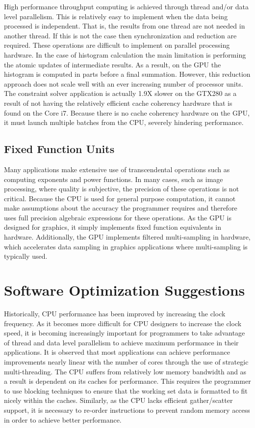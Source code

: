\documentclass[conference]{IEEEtran}
\begin{document}
High performance throughput computing is achieved through thread and/or data level parallelism. This is relatively easy to implement when the data being processed is independent. That is, the results from one thread are not needed in another thread. If this is not the case then synchronization and reduction are required. These operations are difficult to implement on parallel processing hardware. In the case of histogram calculation the main limitation is performing the atomic updates of intermediate results. As a result, on the GPU the histogram is computed in parts before a final summation. However, this reduction approach does not scale well with an ever increasing number of processor units. The constraint solver application is actually 1.9X slower on the GTX280 as a result of not having the relatively efficient cache coherency hardware that is found on the Core i7. Because there is no cache coherency hardware on the GPU, it must launch multiple batches from the CPU, severely hindering performance. 

\subsection{Fixed Function Units}

Many applications make extensive use of transcendental operations such as computing exponents and power functions. In many cases, such as image processing, where quality is subjective, the precision of these operations is not critical. Because the CPU is used for general purpose computation, it cannot make assumptions about the accuracy the programmer requires and therefore uses full precision algebraic expressions for these operations. As the GPU is designed for graphics, it simply implements fixed function equivalents in hardware. Additionally, the GPU implements filtered multi-sampling in hardware, which accelerates data sampling in graphics applications where multi-sampling is typically used.

\section{Software Optimization Suggestions}

Historically, CPU performance has been improved by increasing the clock frequency. As it becomes more difficult for CPU designers to increase the clock speed, it is becoming increasingly important for programmers to take advantage of thread and data level parallelism to achieve maximum performance in their applications. It is observed that most applications can achieve  performance improvements nearly linear with the number of cores through the use of strategic multi-threading. The CPU suffers from relatively low memory bandwidth and as a result is dependent on its caches for performance. This requires the programmer to use blocking techniques to ensure that the working set data is formatted to fit nicely within the caches. Similarly, as the CPU lacks efficient gather/scatter support, it is necessary to re-order instructions to prevent random memory access in order to achieve better performance. 
\end{document}

